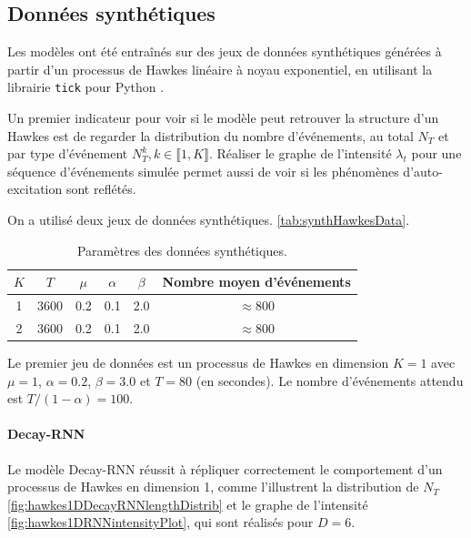 \documentclass[../main.tex]{subfiles}
\begin{document}
\subsection{Données synthétiques}\label{ssec:synthResults}

Les modèles ont été entraînés sur des jeux de données synthétiques générées à partir d'un processus de Hawkes linéaire à noyau exponentiel, en utilisant la librairie \verb|tick| pour Python \cite{2017arXiv170703003B}.

Un premier indicateur pour voir si le modèle peut retrouver la structure d'un Hawkes est de regarder la distribution du nombre d'événements, au total $N_T$ et par type d'événement $N^k_T, k\in\llbracket 1,K\rrbracket$. Réaliser le graphe de l'intensité $\lambda_t$ pour une séquence d'événements simulée permet aussi de voir si les phénomènes d'auto-excitation sont reflétés.

On a utilisé deux jeux de données synthétiques. \autoref{tab:synthHawkesData}.

\begin{table}[h]
	\centering
	\begin{tabular}[]{cccccc}
		\toprule
		$K$ & $T$ & $\mu$ & $\alpha$ & $\beta$ & Nombre moyen d'événements \\ \hline\hline
		1 & 3600 & 0.2 & 0.1 & 2.0 & $\approx 800$ \\\hline
		2 & 3600 & 0.2 & 0.1 & 2.0 & $\approx 800$
	\end{tabular}
	\caption{Paramètres des données synthétiques.}\label{tab:synthHawkesData}
\end{table}

Le premier jeu de données est un processus de Hawkes en dimension $K=1$ avec $\mu=1$, $\alpha = \num{0.2}$, $\beta = \num{3.0}$ et $T = \num{80}$ (en secondes). Le nombre d'événements attendu est $T/(1-\alpha) = \num{100}$.

\paragraph{Decay-RNN}
Le modèle Decay-RNN réussit à répliquer correctement le comportement d'un processus de Hawkes en dimension 1, comme l'illustrent la distribution de $N_T$ \cref{fig:hawkes1DDecayRNNlengthDistrib} et le graphe de l'intensité \cref{fig:hawkes1DRNNintensityPlot}, qui sont réalisés pour $D=6$.\footnotemark

\end{document}
